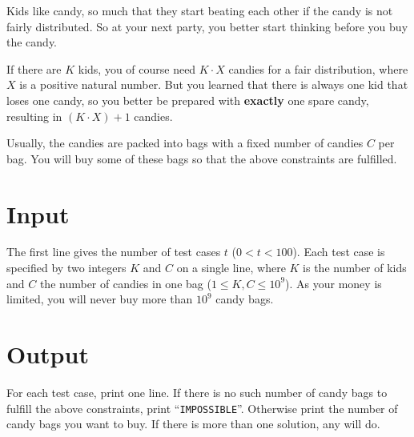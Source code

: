 
Kids like candy, so much that they start beating each other if the candy
is not fairly distributed. So at your next party, you better start thinking
before you buy the candy.

If there are $K$ kids, you of course need $K \cdot X$ candies for a fair
distribution, where $X$ is a positive natural number. But you learned that
there is always one kid that loses one candy, so you better be prepared with {\bf
exactly} one spare candy, resulting in $(K \cdot X) + 1$ candies.

Usually, the candies are packed into bags with a fixed number of candies $C$ per bag.
You will buy some of these bags so that the above constraints are fulfilled.

\section*{Input}
The first line gives the number of test cases $t$ ($0 < t < 100$). Each test
case is specified by two integers $K$ and $C$ on a single line, where $K$ is
the number of kids and $C$ the number of candies in one bag ($1 \le K, C \le
10^9$). As your money is limited, you will never buy more than $10^9$ candy
bags.

\section*{Output}
For each test case, print one line. If there is no such number of candy bags to
fulfill the above constraints, print ``{\tt IMPOSSIBLE}''. Otherwise
print the number of candy bags you want to buy. If there is more than one
solution, any will do.

